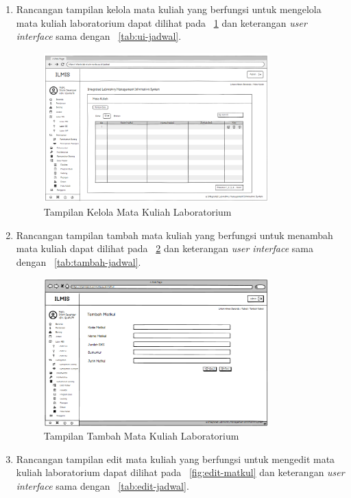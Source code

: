 \begin{enumerate}
	\item Rancangan tampilan kelola mata kuliah yang berfungsi untuk mengelola mata kuliah laboratorium dapat dilihat pada \pic~\ref{fig:matkul} dan keterangan \textit{user interface} sama dengan \tab~\ref{tab:ui-jadwal}.
	      \begin{figure}
		      \centering
		      \includegraphics[width=0.82\textwidth]{konten/gambar/user interface/ui-matkul.png}
		      \caption{Tampilan Kelola Mata Kuliah Laboratorium}
		      \label{fig:matkul}
	      \end{figure}
	\item Rancangan tampilan tambah mata kuliah yang berfungsi untuk menambah mata kuliah dapat dilihat pada \pic~\ref{fig:tambah-matkul} dan keterangan \textit{user interface} sama dengan \tab~\ref{tab:tambah-jadwal}.
	      \begin{figure}
		      \centering
		      \includegraphics[width=0.82\textwidth]{konten/gambar/user interface/tambah-matkul.png}
		      \caption{Tampilan Tambah Mata Kuliah Laboratorium}
		      \label{fig:tambah-matkul}
	      \end{figure}
	\item Rancangan tampilan edit mata kuliah yang berfungsi untuk mengedit mata kuliah laboratorium dapat dilihat pada \pic~\ref{fig:edit-matkul} dan keterangan \textit{user interface} sama dengan \tab~\ref{tab:edit-jadwal}.

\end{enumerate}
